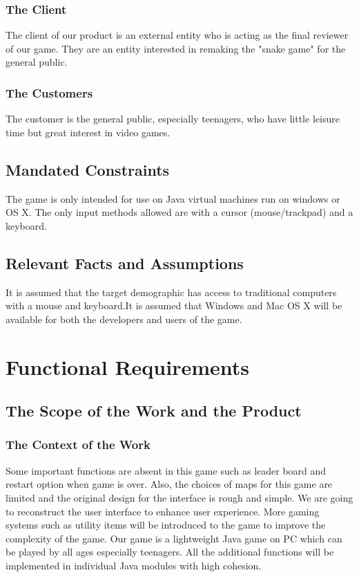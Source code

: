 \documentclass[12pt, titlepage]{article}
\begin{document}
\subsubsection{The Client}
The client of our product is an external entity who is acting as the final reviewer of our game. They are an entity interested in remaking the "snake game" for the general public.

\subsubsection{The Customers}
The customer is the general public, especially teenagers, who have little leisure time but great interest in video games.

\subsection{Mandated Constraints}
The game is only intended for use on Java virtual machines run on windows or OS X.
The only input methods allowed are with a cursor (mouse/trackpad) and a keyboard. 

\subsection{Relevant Facts and Assumptions}
It is assumed that the target demographic has access to traditional computers with a mouse and keyboard.It is assumed that Windows and Mac OS X will be available for both the developers and users of the game.

\section{Functional Requirements}

\subsection{The Scope of the Work and the Product}

\subsubsection{The Context of the Work}
Some important functions are absent in this game such as leader board and restart option when game is over. Also, the choices of maps for this game are limited and the original design for the interface is rough and simple. We are going to reconstruct the user interface to enhance user experience. More gaming systems such as utility items will be introduced to the game to improve the complexity of the game. Our game is a lightweight Java game on PC which can be played by all ages especially teenagers. All the additional functions will be implemented in individual Java modules with high cohesion.
\end{document}
